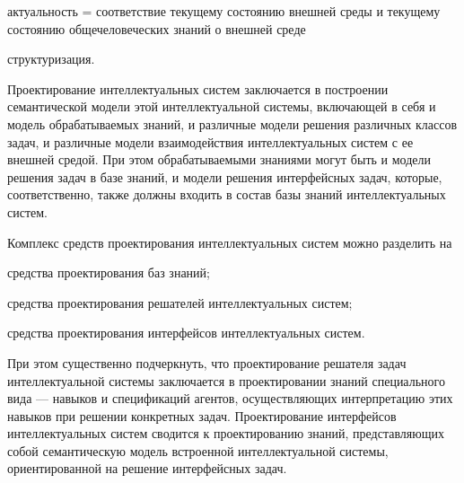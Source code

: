 \begin{SCn}
{\begin{scnitemize}
\item актуальность = соответствие текущему состоянию внешней среды и текущему состоянию общечеловеческих знаний о внешней среде

\item структуризация.
\end{scnitemize}

Проектирование интеллектуальных систем заключается в построении семантической модели этой интеллектуальной системы, включающей в себя и модель обрабатываемых знаний, и различные модели решения различных классов задач, и различные модели взаимодействия интеллектуальных систем с ее внешней средой. При этом обрабатываемыми знаниями могут быть и модели решения задач в базе знаний, и модели решения интерфейсных задач, которые, соответственно, также должны входить в состав базы знаний интеллектуальных систем.

Комплекс средств проектирования интеллектуальных систем можно разделить на

\begin{scnitemize}
    \item средства проектирования баз знаний;
    \item средства проектирования решателей интеллектуальных систем;
    \item средства проектирования интерфейсов интеллектуальных систем.
\end{scnitemize}

При этом существенно подчеркнуть, что проектирование решателя задач интеллектуальной системы заключается в проектировании знаний специального вида — навыков и спецификаций агентов, осуществляющих интерпретацию этих навыков при решении конкретных задач. Проектирование интерфейсов интеллектуальных систем сводится к проектированию знаний, представляющих собой семантическую модель встроенной интеллектуальной системы, ориентированной на решение интерфейсных задач.

}
\end{SCn}

